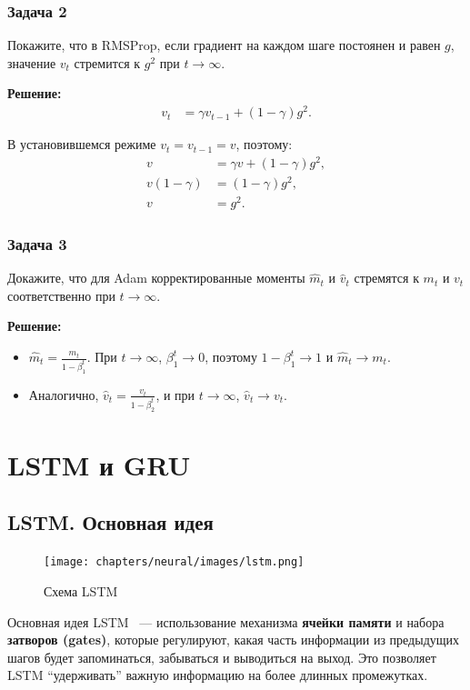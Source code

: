 \subsubsection*{Задача 2}
Покажите, что в RMSProp, если градиент на каждом шаге постоянен и равен $g$, значение $v_t$ стремится к $g^2$ при $t \to \infty$.

\textbf{Решение:}
\begin{align*}
    v_t &= \gamma v_{t-1} + (1 - \gamma) g^2.
\end{align*}

В установившемся режиме $v_t = v_{t-1} = v$, поэтому:
\begin{align*}
    v &= \gamma v + (1 - \gamma) g^2, \\
    v (1 - \gamma) &= (1 - \gamma) g^2, \\
    v &= g^2.
\end{align*}

\subsubsection*{Задача 3}
Докажите, что для Adam корректированные моменты $\hat{m}_t$ и $\hat{v}_t$ стремятся к $m_t$ и $v_t$ соответственно при $t \to \infty$.

\textbf{Решение:}
\begin{itemize}
    \item $\hat{m}_t = \frac{m_t}{1 - \beta_1^t}$. При $t \to \infty$, $\beta_1^t \to 0$, поэтому $1 - \beta_1^t \to 1$ и $\hat{m}_t \to m_t$.
    \item Аналогично, $\hat{v}_t = \frac{v_t}{1 - \beta_2^t}$, и при $t \to \infty$, $\hat{v}_t \to v_t$.
\end{itemize}

\section{LSTM и GRU}

\subsection{LSTM. Основная идея}

\begin{figure}[h]
	\centering
	\texttt{[image: chapters/neural/images/lstm.png]}
	\caption{Схема LSTM}
	\label{img:lstm}
\end{figure}
Основная идея LSTM~\cite{hochreiter1997long} --- использование механизма \textbf{ячейки памяти} и набора \textbf{затворов (gates)}, которые регулируют, какая часть информации из предыдущих шагов будет запоминаться, забываться и выводиться на выход. Это позволяет LSTM ``удерживать'' важную информацию на более длинных промежутках.

